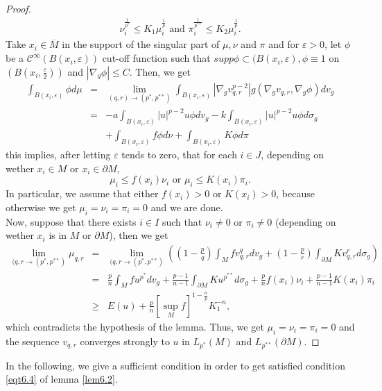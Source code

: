 \documentclass{Tran-l}
\theoremstyle{definition}
\theoremstyle{remark}
\numberwithin{equation}{section}
\begin{document}
\begin{proof}
\begin{eqnarray*}
            \nu_i^{\frac{1}{p^*}}\le K_1\mu_i^{\frac{1}{p}} \text{   and }
             \pi_i^{\frac{1}{p^{**}}}\le K_2\mu_i^{\frac{1}{p}}.
          \end{eqnarray*}
Take $x_i\in\overline M$ in the support of the singular part of
$\mu,\nu$ and $\pi$ and for $\varepsilon>0$, let $\phi$ be a
${\mathcal{C}}^{\infty}(B(x_i,\varepsilon))$ cut-off function such that
$supp\phi\subset(B(x_i,\varepsilon),\phi\equiv1$ on
$(B(x_i,\frac{\varepsilon}{2}))$ and $|\nabla_g\phi|\leq C$. Then,
we get
\begin{eqnarray*}
\int_{B(x_i,\varepsilon)}\phi
d\mu&=&\lim_{(q,r)\rightarrow(p^*,p^{**})}\int_{B(x_i,\varepsilon)}
|\nabla_gv_{q,r}^{p-2}|g
(\nabla_gv_{q,r},\nabla_g\phi)dv_g \\
&=&-a\int_{B(x_i,\varepsilon)}|u|^{p-2}u\phi
dv_g-k\int_{B(x_i,\varepsilon)}|u|^{p-2}u\phi
d\sigma_g\\&&+\int_{B(x_i,\varepsilon)}f\phi
d\nu+\int_{B(x_i,\varepsilon)}K\phi d\pi
\end{eqnarray*}
this implies, after letting $\varepsilon$ tends to zero, that for
each $i\in J$, depending on wether $x_i\in M$ or $x_i\in\partial M$,
\begin{equation*}
    \mu_i\le f(x_i)\nu_i \text{ or }\mu_i\le K(x_i)\pi_i.
\end{equation*}
In particular, we assume that either $f(x_i)>0$ or $K(x_i)>0$,
because otherwise we get
$\mu_i=\nu_i=\pi_i=0$ and we are done.\\
Now, suppose that there exists $i\in I$ such that $\nu_i\neq0$ or
$\pi_i\neq0$ (depending on wether $x_i$ is in $M$ or $\partial M$),
then we get
\begin{eqnarray*}
\underset{(q,r\rightarrow(p^*,p^{**})} \lim\mu_{q,r}&=&
\underset{(q,r\rightarrow(p^*,p^{**})}\lim
\left((1-\frac{p}{q})\int_Mfv_{q,r}^qdv_g+
(1-\frac{p}{r})\int_{\partial M}Kv_{q,r}^rd\sigma_g\right) \\
&=&\frac{p}{n}\int_Mfu^{p^*}dv_g+\frac{p-1}{n-1}\int_{\partial
M}Ku^{p^{**}}d\sigma_g+\frac{p}{n}f(x_i)\nu_i+\frac{p-1}{n-1}K(x_i)\pi_i\\&\geq&
E(u)+\frac{p}{n}\left[\sup_Mf\right]^{1-\frac{n}{p}}K_1^{-n},
\end{eqnarray*}
which contradicts the hypothesis of the lemma. Thus, we get
$\mu_i=\nu_i=\pi_i=0$ and the sequence $v_{q,r}$ converges strongly
to $u$ in $L_{p^*}(M)$ and $L_{p^{**}}(\partial M)$.
\end{proof}
In the following, we give a sufficient condition in order to get
satisfied condition \eqref{eqt6.4} of lemma \ref{lem6.2}.
\end{document}
